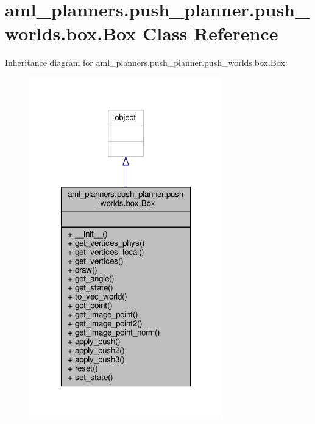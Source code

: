 \hypertarget{classaml__planners_1_1push__planner_1_1push__worlds_1_1box_1_1_box}{\section{aml\-\_\-planners.\-push\-\_\-planner.\-push\-\_\-worlds.\-box.\-Box Class Reference}
\label{classaml__planners_1_1push__planner_1_1push__worlds_1_1box_1_1_box}
}


Inheritance diagram for aml\-\_\-planners.\-push\-\_\-planner.\-push\-\_\-worlds.\-box.\-Box\-:
\nopagebreak
\begin{figure}[H]
\begin{center}
\leavevmode
\includegraphics[width=238pt]{classaml__planners_1_1push__planner_1_1push__worlds_1_1box_1_1_box__inherit__graph}
\end{center}
\end{figure}



